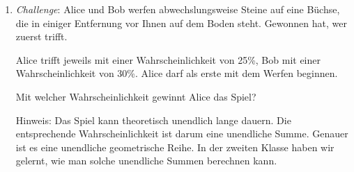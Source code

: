 \begin{ueb}
\begin{enumerate}
\begin{enumerate}
            \item Wie oft müsste ein solcher Würfel mindestens geworfen werden, damit die Wahrscheinlichkeit für mindestens eine «1» eineinhalb Mal so hoch ist wie in Teilaufgabe (a)?
          \end{enumerate}
          \pagebreak

    \item \emph{Challenge}: Alice und Bob werfen abwechslungsweise Steine auf eine Büchse, die in einiger Entfernung vor Ihnen auf dem Boden steht. Gewonnen hat, wer zuerst trifft.

          Alice trifft jeweils mit einer Wahrscheinlichkeit von 25\%, Bob mit einer Wahrscheinlichkeit von 30\%. Alice darf als erste mit dem Werfen beginnen.

          Mit welcher Wahrscheinlichkeit gewinnt Alice das Spiel?

          Hinweis: Das Spiel kann theoretisch unendlich lange dauern. Die entsprechende Wahrscheinlichkeit ist darum eine unendliche Summe. Genauer ist es eine unendliche geometrische Reihe. In der zweiten Klasse haben wir gelernt, wie man solche unendliche Summen berechnen kann.

  \end{enumerate}

\end{ueb}

